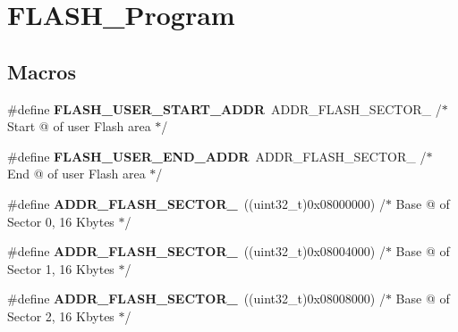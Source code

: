 \hypertarget{group___f_l_a_s_h___program}{\section{F\-L\-A\-S\-H\-\_\-\-Program}
\label{group___f_l_a_s_h___program}
}
\subsection*{Macros}
\begin{DoxyCompactItemize}
\item 
\hypertarget{group___f_l_a_s_h___program_gaa4f22c9236f667f99aea9076efa53fc7}{\#define {\bfseries F\-L\-A\-S\-H\-\_\-\-U\-S\-E\-R\-\_\-\-S\-T\-A\-R\-T\-\_\-\-A\-D\-D\-R}~A\-D\-D\-R\-\_\-\-F\-L\-A\-S\-H\-\_\-\-S\-E\-C\-T\-O\-R\-\_   /$\ast$ Start @ of user Flash area $\ast$/}\label{group___f_l_a_s_h___program_gaa4f22c9236f667f99aea9076efa53fc7}

\item 
\hypertarget{group___f_l_a_s_h___program_gae2f33bed60f6cd95c93fa2aec487a0ef}{\#define {\bfseries F\-L\-A\-S\-H\-\_\-\-U\-S\-E\-R\-\_\-\-E\-N\-D\-\_\-\-A\-D\-D\-R}~A\-D\-D\-R\-\_\-\-F\-L\-A\-S\-H\-\_\-\-S\-E\-C\-T\-O\-R\-\_   /$\ast$ End @ of user Flash area $\ast$/}\label{group___f_l_a_s_h___program_gae2f33bed60f6cd95c93fa2aec487a0ef}

\item 
\hypertarget{group___f_l_a_s_h___program_ga1a626254790c0810ff2dda356393e10c}{\#define {\bfseries A\-D\-D\-R\-\_\-\-F\-L\-A\-S\-H\-\_\-\-S\-E\-C\-T\-O\-R\-\_}~((uint32\-\_\-t)0x08000000) /$\ast$ Base @ of Sector 0, 16 Kbytes $\ast$/}\label{group___f_l_a_s_h___program_ga1a626254790c0810ff2dda356393e10c}

\item 
\hypertarget{group___f_l_a_s_h___program_ga3921df9831b40afc489e0abb4ae2e1d8}{\#define {\bfseries A\-D\-D\-R\-\_\-\-F\-L\-A\-S\-H\-\_\-\-S\-E\-C\-T\-O\-R\-\_}~((uint32\-\_\-t)0x08004000) /$\ast$ Base @ of Sector 1, 16 Kbytes $\ast$/}\label{group___f_l_a_s_h___program_ga3921df9831b40afc489e0abb4ae2e1d8}

\item 
\hypertarget{group___f_l_a_s_h___program_ga252ab8bba2a5556d7aa70c4629749b25}{\#define {\bfseries A\-D\-D\-R\-\_\-\-F\-L\-A\-S\-H\-\_\-\-S\-E\-C\-T\-O\-R\-\_}~((uint32\-\_\-t)0x08008000) /$\ast$ Base @ of Sector 2, 16 Kbytes $\ast$/}\label{group___f_l_a_s_h___program_ga252ab8bba2a5556d7aa70c4629749b25}


\end{DoxyCompactItemize}

